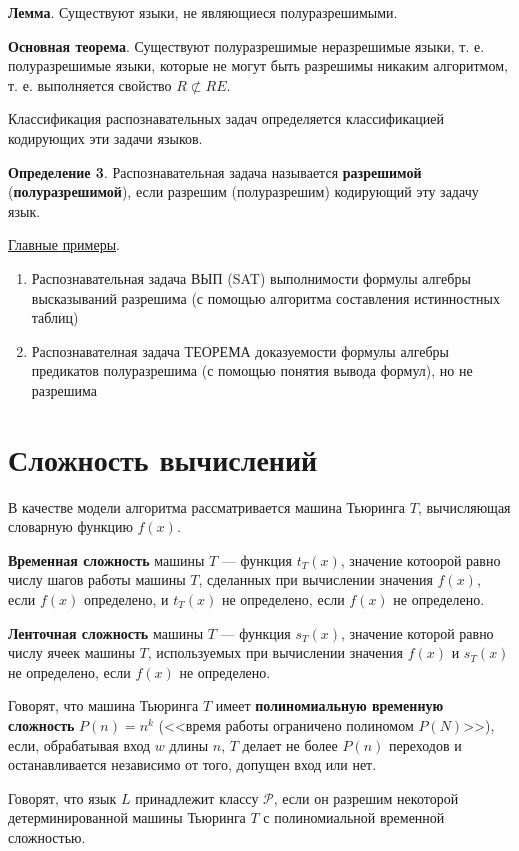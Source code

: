 \textbf{Лемма}. Существуют языки, не являющиеся полуразрешимыми.

\textbf{Основная теорема}. Существуют полуразрешимые неразрешимые языки, т. е. полуразрешимые языки, которые не могут быть разрешимы никаким алгоритмом, т. е. выполняется свойство $R \not\subset RE$.

Классификация распознавательных задач определяется классификацией кодирующих эти задачи языков.

\textbf{Определение 3}. Распознавательная задача называется \textbf{разрешимой} (\textbf{полуразрешимой}), если разрешим (полуразрешим) кодирующий эту задачу язык.

\underline{Главные примеры}.

\begin{enumerate}
    \item Распознавательная задача ВЫП (SAT) выполнимости формулы алгебры высказываний разрешима (с помощью алгоритма составления истинностных таблиц)
    \item Распознавателная задача ТЕОРЕМА доказуемости формулы алгебры предикатов полуразрешима (с помощью понятия вывода формул), но не разрешима
\end{enumerate}

\section{Сложность вычислений}
В качестве модели алгоритма рассматривается машина Тьюринга $T$, вычисляющая словарную функцию $f(x)$.

\dftion \textbf{Временная сложность} машины $T$ --- функция $t_T(x)$, значение котоорой равно числу шагов работы машины $T$, сделанных при вычислении значения $f(x)$, если $f(x)$ определено, и $t_T(x)$ не определено, если $f(x)$ не определено.

\dftion \textbf{Ленточная сложность} машины $T$ --- функция $s_T(x)$, значение которой равно числу ячеек машины $T$, используемых при вычислении значения $f(x)$ и $s_T(x)$ не определено, если $f(x)$ не определено.

Говорят, что машина Тьюринга $T$ имеет \textbf{полиномиальную временную сложность} $P(n)=n^k$ (<<время работы ограничено полиномом $P(N)$>>), если, обрабатывая вход $w$ длины $n$, $T$ делает не более $P(n)$ переходов и останавливается независимо от того, допущен вход или нет.

\dftion Говорят, что язык $L$ принадлежит классу $\mathscr{P}$, если он разрешим некоторой детерминированной машины Тьюринга $T$ с полиномиальной временной сложностью.

